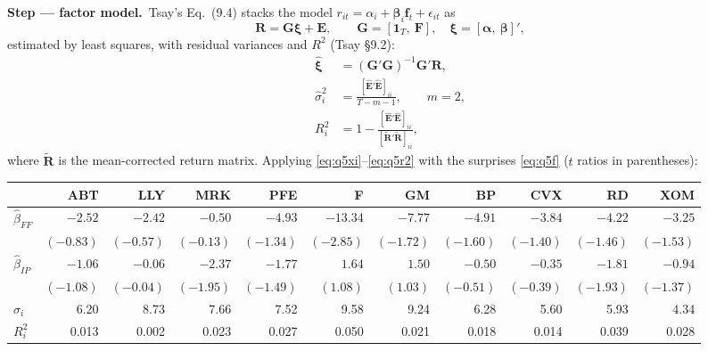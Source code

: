 \documentclass[11pt,a4paper]{article}
\newcommand{\passo}[2]{\par\smallskip\noindent\textbf{Step --- #1.}~#2}
\begin{document}
\begin{sol}
\passo{factor model}{Tsay's Eq.~(9.4) stacks the model $r_{it}=\alpha_i+\bm\beta_i\bm f_t+\epsilon_{it}$ as
\begin{equation}
\bm R=\bm G\bm\xi+\bm E,\qquad \bm G=[\bm 1_T,\ \bm F],\quad \bm\xi=[\bm\alpha,\ \bm\beta]',\label{eq:q5mlr}
\end{equation}
estimated by least squares, with residual variances and $R^2$ (Tsay \S9.2):
\begin{align}
\hat{\bm\xi}&=(\bm G'\bm G)^{-1}\bm G'\bm R,\label{eq:q5xi}\\
\hat\sigma_i^2&=\frac{[\hat{\bm E}'\hat{\bm E}]_{ii}}{T-m-1},\qquad m=2,\label{eq:q5s2}\\
R_i^2&=1-\frac{[\hat{\bm E}'\hat{\bm E}]_{ii}}{[\tilde{\bm R}'\tilde{\bm R}]_{ii}},\label{eq:q5r2}
\end{align}
where $\tilde{\bm R}$ is the mean-corrected return matrix. Applying \eqref{eq:q5xi}--\eqref{eq:q5r2} with the
surprises \eqref{eq:q5f} ($t$ ratios in parentheses):}
\begin{center}\footnotesize\setlength{\tabcolsep}{4pt}
\begin{tabular}{lrrrrrrrrrr}
\toprule
 & ABT & LLY & MRK & PFE & F & GM & BP & CVX & RD & XOM\\
\midrule
$\hat\beta_{FF}$ & $-2.52$ & $-2.42$ & $-0.50$ & $-4.93$ & $-13.34$ & $-7.77$ & $-4.91$ & $-3.84$ & $-4.22$ & $-3.25$\\
 & $(-0.83)$ & $(-0.57)$ & $(-0.13)$ & $(-1.34)$ & $(-2.85)$ & $(-1.72)$ & $(-1.60)$ & $(-1.40)$ & $(-1.46)$ & $(-1.53)$\\
$\hat\beta_{IP}$ & $-1.06$ & $-0.06$ & $-2.37$ & $-1.77$ & $1.64$ & $1.50$ & $-0.50$ & $-0.35$ & $-1.81$ & $-0.94$\\
 & $(-1.08)$ & $(-0.04)$ & $(-1.95)$ & $(-1.49)$ & $(1.08)$ & $(1.03)$ & $(-0.51)$ & $(-0.39)$ & $(-1.93)$ & $(-1.37)$\\
$\hat\sigma_i$ & 6.20 & 8.73 & 7.66 & 7.52 & 9.58 & 9.24 & 6.28 & 5.60 & 5.93 & 4.34\\
$R^2_i$ & 0.013 & 0.002 & 0.023 & 0.027 & 0.050 & 0.021 & 0.018 & 0.014 & 0.039 & 0.028\\
\bottomrule
\end{tabular}
\end{center}


\end{sol}
\end{document}
